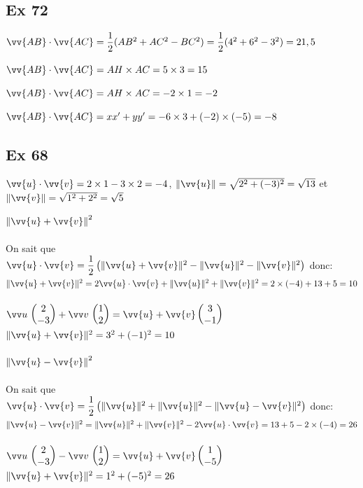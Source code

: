 \documentclass[12pt,a4paper]{book}
\begin{document}
\subsection*{Ex 72}
\begin{enumMet}
    \item $\vv{AB}\cdot\vv{AC}=\dfrac{1}{2}(AB^2+AC^2-BC^2)=\dfrac{1}{2}(4^2+6^2-3^2)=21,5$
    \item $\vv{AB}\cdot\vv{AC}=AH\times AC=5\times3=15$
    \item $\vv{AB}\cdot\vv{AC}=AH\times AC=-2\times1=-2$
    \item $\vv{AB}\cdot\vv{AC}=xx'+yy'=-6\times3+(-2)\times(-5)=-8$
\end{enumMet}

\subsection*{Ex 68}
\begin{enumMet}
    \item $\vv{u}\cdot\vv{v}=2\times1-3\times2=-4$, $\left\|\vv{u}\right\|=\sqrt{2^2+(-3)^2}=\sqrt{13}$ et $\left\|\vv{v}\right\|=\sqrt{1^2+2^2}=\sqrt{5}$
    \item $\left\|\vv{u}+\vv{v}\right\|^2$\\
    \\
    On sait que $\vv{u} \cdot \vv{v}=\dfrac{1}{2}\left(\|\vv{u}+\vv{v}\|^{2}-\|\vv{u}\|^{2}-\|\vv{v}\|^{2}\right)$ donc:\\
    $\|\vv{u}+\vv{v}\|^{2}=2\vv{u} \cdot \vv{v}+\|\vv{u}\|^{2}+\|\vv{v}\|^{2}=2\times(-4)+13+5=10$\\
    \\
    $\Coord{u}{2}{-3}+\Coord{v}{1}{2}=\vv{u}+\vv{v} \CoordSV{3}{-1}$\\
    $\|\vv{u}+\vv{v}\|^{2}=3^2+(-1)^2=10$\\
    \ \\
    $\left\|\vv{u}-\vv{v}\right\|^2$\\
    \\
    On sait que $\vv{u} \cdot \vv{v}=\dfrac{1}{2}\left(\|\vv{u}\|^{2}+\|\vv{u}\|^{2}-\|\vv{u}-\vv{v}\|^{2}\right)$ donc:\\
    $\|\vv{u}-\vv{v}\|^{2}=\|\vv{u}\|^{2}+\|\vv{v}\|^{2}-2\vv{u} \cdot \vv{v}=13+5-2\times(-4)=26$\\
    \\
    $\Coord{u}{2}{-3}-\Coord{v}{1}{2}=\vv{u}+\vv{v} \CoordSV{1}{-5}$\\
    $\|\vv{u}+\vv{v}\|^{2}=1^2+(-5)^2=26$
    \item 
\end{enumMet}
\end{document}
